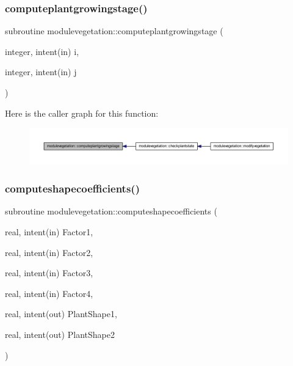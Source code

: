 \subsubsection{\texorpdfstring{computeplantgrowingstage()}{computeplantgrowingstage()}}
{\footnotesize\ttfamily subroutine modulevegetation\+::computeplantgrowingstage (\begin{DoxyParamCaption}\item[{integer, intent(in)}]{i,  }\item[{integer, intent(in)}]{j }\end{DoxyParamCaption})\hspace{0.3cm}{\ttfamily [private]}}

Here is the caller graph for this function\+:\nopagebreak
\begin{figure}[H]
\begin{center}
\leavevmode
\includegraphics[width=350pt]{namespacemodulevegetation_a57fef770d6b519b24b11d4ce771e5c20_icgraph}
\end{center}
\end{figure}
\mbox{\label{namespacemodulevegetation_a977606da8238f3bcf3eeedafa42a6582}} 
\subsubsection{\texorpdfstring{computeshapecoefficients()}{computeshapecoefficients()}}
{\footnotesize\ttfamily subroutine modulevegetation\+::computeshapecoefficients (\begin{DoxyParamCaption}\item[{real, intent(in)}]{Factor1,  }\item[{real, intent(in)}]{Factor2,  }\item[{real, intent(in)}]{Factor3,  }\item[{real, intent(in)}]{Factor4,  }\item[{real, intent(out)}]{Plant\+Shape1,  }\item[{real, intent(out)}]{Plant\+Shape2 }\end{DoxyParamCaption})\hspace{0.3cm}{\ttfamily [private]}}

